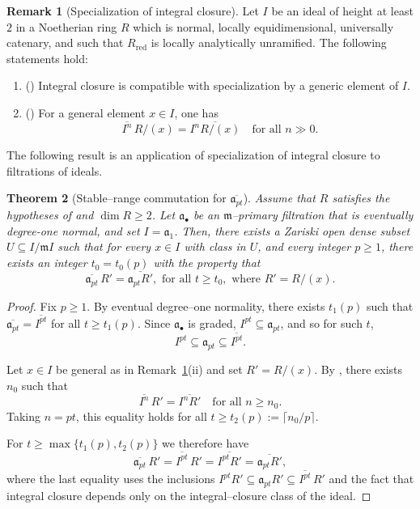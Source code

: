 \documentclass[12pt]{amsart}
\newcommand{\m}{\mathfrak m}
\renewcommand{\a}{\mathfrak{a}}
\newcommand{\abul}{{\a_\bullet}}
\theoremstyle{plain}
\newtheorem{theorem}{Theorem}[section]
\theoremstyle{definition}
\newtheorem{remark}[theorem]{Remark}
\numberwithin{equation}{section}
\begin{document}
\begin{remark}[Specialization of integral closure]
\label{rem:HU-HL}
Let $I$ be an ideal of height at least $2$ in a Noetherian ring $R$ which is normal,
locally equidimensional, universally catenary, and such that $R_{\mathrm{red}}$
is locally analytically unramified.
The following statements hold:
\begin{enumerate}
\item[(i)]
(\cite[Theorem~2.1]{HongUlrich2014})
Integral closure is compatible with specialization by a generic element of $I$.
\item[(ii)]
(\cite[Proposition~3.7]{HillLynn2024})
For a general element $x\in I$, one has
\[
\overline{I^n}\,R/(x)=\overline{I^nR/(x)}
\quad \text{for all } n\gg 0.
\]
\end{enumerate}
\end{remark}

The following result is an application of specialization of integral closure to filtrations of ideals.

\begin{theorem}[Stable--range commutation for $\overline{\a_{pt}}$]
\label{thm:specialization-a}
Assume that $R$ satisfies the hypotheses of  and $\dim R \ge 2$.
Let $\abul$ be an $\m$--primary filtration that is eventually degree-one normal, and set $I=\a_1$.
Then, there exists a Zariski open dense subset $U\subseteq I/\m I$ such that
for every $x\in I$ with class in $U$, and every integer $p \ge 1$, there exists an integer $t_0=t_0(p)$ with the property that
\[
\overline{\a_{pt}}\,R'=\overline{\a_{pt}R'},
\text{  for all } t\ge t_0, \text{  where } R' = R/(x).
\]
\end{theorem}

\begin{proof}
Fix $p\ge1$.
By eventual degree--one normality, there exists $t_1(p)$ such that
$\overline{\a_{pt}}=\overline{I^{pt}}$ for all $t\ge t_1(p)$.
Since $\abul$ is graded, $I^{pt}\subseteq \a_{pt}$, and so for such $t$,
\[
I^{pt}\subseteq \a_{pt}\subseteq \overline{I^{pt}}.
\]

Let $x\in I$ be general as in
Remark~\ref{rem:HU-HL}(ii) and set $R'=R/(x)$.
By \cite[Proposition~3.7]{HillLynn2024}, there exists $n_0$ such that
\[
\overline{I^{n}}\,R'=\overline{I^{n}R'}
\quad \text{for all } n\ge n_0.
\]
Taking $n=pt$, this equality holds for all $t\ge t_2(p):=\lceil n_0/p\rceil$.

For $t\ge \max\{t_1(p),t_2(p)\}$ we therefore have
\[
\overline{\a_{pt}}\,R'
=\overline{I^{pt}}\,R'
=\overline{I^{pt}R'}
=\overline{\a_{pt}R'},
\]
where the last equality uses the inclusions
$I^{pt}R'\subseteq \a_{pt}R'\subseteq \overline{I^{pt}}\,R'$ and the fact that
integral closure depends only on the integral--closure class of the ideal.
\end{proof}
\end{document}
